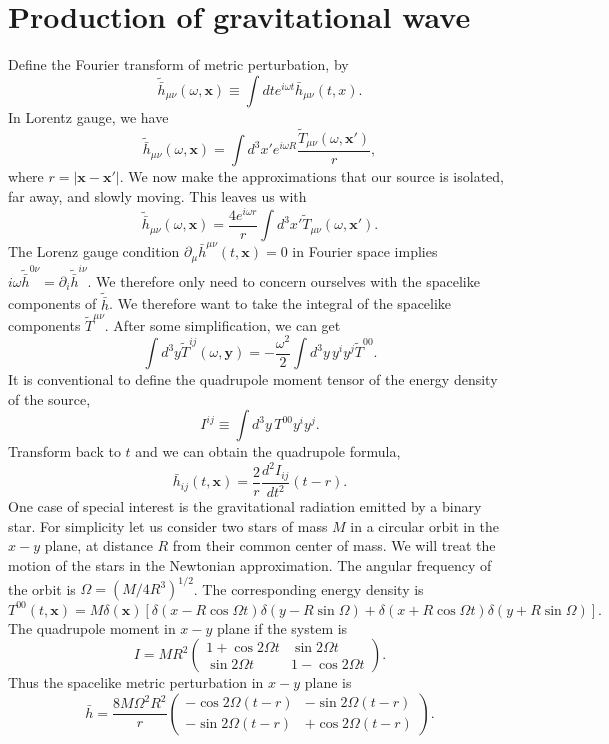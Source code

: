 \section{Production of gravitational wave}
Define the Fourier transform of metric perturbation, by
\[\widetilde{\bar{h}}_{\mu\nu}(\omega, \bm{x}) \equiv \int dt e^{i\omega t} \bar{h}_{\mu\nu}(t,x).\]
In Lorentz gauge, we have
\[\widetilde{\bar{h}}_{\mu\nu}(\omega, \bm{x}) = \int d^3x' e^{i\omega R} \frac{\widetilde{T}_{\mu\nu}(\omega,\bm{x}')}{r},\]
where $r = |\bm{x} - \bm{x}'|$.
We now make the approximations that our source is isolated, far away, and slowly moving. This leaves us with
\[\widetilde{\bar{h}}_{\mu\nu}(\omega, \bm{x}) = \frac{4e^{i\omega r}}{r} \int d^3x' \tilde{T}_{\mu\nu}(\omega, \bm{x}').\]
The Lorenz gauge condition $\partial_{\mu}\bar{h}^{\mu\nu}(t,\bm{x}) = 0$ in Fourier space implies $i\omega \widetilde{\bar{h}}^{0\nu} = \partial_{i} \widetilde{\bar{h}}^{i\nu}$. 
We therefore only need to concern ourselves with the spacelike components of $\widetilde{\bar{h}}$.
We therefore want to take the integral of the spacelike components $\widetilde{T}^{\mu\nu}$. After some simplification, we can get
\[\int d^3y \widetilde{T}^{ij}(\omega,\bm{y}) = - \frac{\omega^2}{2} \int  d^3y \, y^i y^j \widetilde{T}^{00}.\]
It is conventional to define the quadrupole moment tensor of the energy density of the source,
\[I^{ij} \equiv \int d^3y \, T^{00} y^i y^j.\]
Transform back to $t$ and we can obtain the quadrupole formula,
\[\bar{h}_{ij}(t,\bm{x}) = \frac{2}{r} \frac{d^2 I_{ij}}{dt^2}(t-r).\]
One case of special interest is the gravitational radiation emitted by a binary star. 
For simplicity let us consider two stars of mass $M$ in a circular orbit in the $x-y$ plane, at distance $R$ from their common center of mass. 
We will treat the motion of the stars in the Newtonian approximation. The angular frequency of the orbit is $\Omega = (M/4R^3)^{1/2}$. 
The corresponding energy density is
\[T^{00}(t,\bm{x}) = M\delta(\bm{x}) [\delta(x-R\cos\Omega t)\delta(y-R\sin\Omega) + \delta(x+R\cos\Omega t)\delta(y+R\sin\Omega)].\]
The quadrupole moment in $x-y$ plane if the system is
\[I = MR^2 \begin{pmatrix}
1 + \cos 2\Omega t & \sin 2\Omega t \\
\sin 2\Omega t & 1 - \cos 2\Omega t
\end{pmatrix}. \]
Thus the spacelike metric perturbation in $x-y$ plane is
\[\bar{h} = \frac{8M\Omega^2R^2}{r} \begin{pmatrix}
- \cos 2\Omega (t-r) & -\sin 2\Omega (t-r) \\
-\sin 2\Omega (t-r) & + \cos 2\Omega (t-r)
\end{pmatrix}. \]

